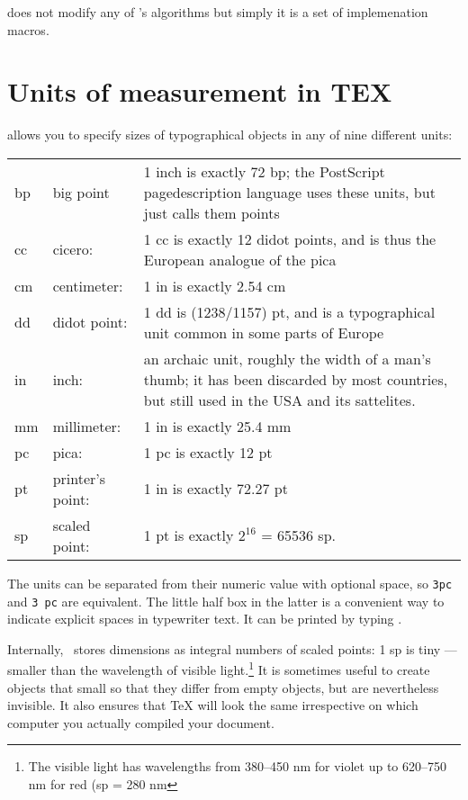 \latex does not modify any of \tex's algorithms but simply it is a set of implemenation
macros.

\section{Units of measurement in TEX}

\tex allows you to specify sizes of typographical objects in any of nine different
units:


\begin{table}[htbp]
\begin{center}
\begin{tabular}{llp{5cm}}
\toprule
bp &big point &1 inch is exactly 72 bp; the PostScript pagedescription language uses these units, but just calls them points\\
cc &cicero: &1 cc is exactly 12 didot points, and is thus the European  analogue of the pica\\
cm &centimeter: &1 in is exactly 2.54 cm\\
dd &didot point: &1 dd is (1238/1157) pt, and is a typographical unit common in some parts of Europe\\
in &inch: &an archaic unit, roughly the width of a man's thumb; it has been discarded by most countries, but still used in the USA and its sattelites.\\
mm &millimeter: &1 in is exactly 25.4 mm\\
pc &pica: &1 pc is exactly 12 pt\\
pt &printer's point: &1 in is exactly 72.27 pt\\ 
sp &scaled point: &1 pt is exactly $2^{16}$ = 65536 sp.\\
\bottomrule
\end{tabular}
\end{center}
\end{table}



The units can be separated from their numeric value with optional space, so
\texttt{3pc} and \verb*+3 pc+ are equivalent. The little half box in the latter is a convenient
way to indicate explicit spaces in typewriter text. It can be printed by typing .

Internally, \tex\ stores dimensions as integral numbers of scaled points:
1 sp is tiny ---  smaller than the wavelength of visible light.\footnote{The visible light has wavelengths from 380--450 nm for violet up to 620--750 nm for red (sp = 280 nm} It is sometimes
useful to create objects that small so that they differ from empty objects,
but are nevertheless invisible. It also ensures that TeX will look the same irrespective on which computer you actually compiled your document.


